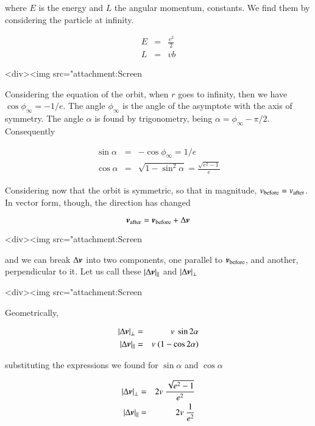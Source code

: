 where $E$ is the energy and $L$ the angular momentum, constants. We find them by considering the particle at infinity. 


\begin{eqnarray}
E &=& \frac{v^2}{2}\\
L &=& vb
\end{eqnarray}


<div><img src="attachment:Screen%


Considering the equation of the orbit, when $r$ goes to infinity, then we have $\cos\phi_\infty = -1/e$. The angle $\phi_\infty$ is the angle of the asymptote with the axis of symmetry. The angle $\alpha$ is found by trigonometry, being $\alpha = \phi_\infty - \pi/2$. Consequently  

\begin{eqnarray}
\sin \alpha &=& -\cos\phi_\infty = 1/e\\
\cos \alpha &=& \sqrt{1-\sin^2\alpha} = \frac{\sqrt{e^2-1}}{e}
\end{eqnarray}

Considering now that the orbit is symmetric, so that in magnitude, $v_{\rm before} = v_{\rm after}$. In vector form, though, the direction has changed


\begin{equation}
{\boldsymbol{v}}_{\rm after} = {\boldsymbol{v}}_{\rm before} + \Delta{\boldsymbol{v}}  
\end{equation}

<div><img src="attachment:Screen%


and we can break $\Delta{\boldsymbol{v}}$ into two components, one parallel to ${\boldsymbol{v}}_{\rm before}$, and another, perpendicular to it. Let us call these $|\Delta {\boldsymbol{v}}|_{||}$ and $|\Delta {\boldsymbol{v}}|_\perp$


<div><img src="attachment:Screen%


Geometrically, 

\begin{eqnarray}
|\Delta {\boldsymbol{v}}|_\perp &=& v \ \sin 2\alpha\\
|\Delta {\boldsymbol{v}}|_{||} &=& v \ (1-\cos 2\alpha)
\end{eqnarray}


substituting the expressions we found for $\sin\alpha$ and $\cos\alpha$


\begin{eqnarray}
|\Delta {\boldsymbol{v}}|_\perp &=& 2v \ \frac{\sqrt{e^2-1}}{e^2}\\
|\Delta {\boldsymbol{v}}|_{||} &=& 2v \ \frac{1}{e^2}
\end{eqnarray}

